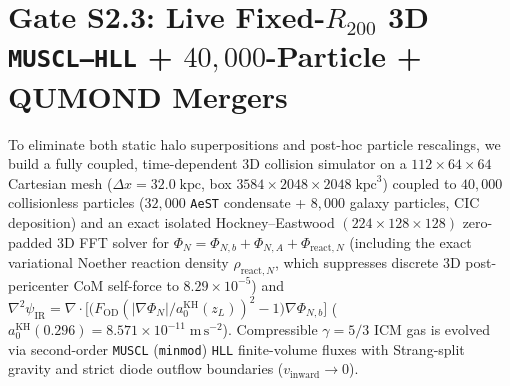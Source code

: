 \documentclass[11pt,a4paper]{article}
\begin{document}
\section{\texorpdfstring{Gate S2.3: Live Fixed-$R_{200}$ 3D \texttt{MUSCL--HLL} + $40{,}000$-Particle + QUMOND Mergers}{Gate S2.3: Live Fixed-R200 3D MUSCL-HLL + 40,000-Particle + QUMOND Mergers}}
\label{sec:step2-bullet}
To eliminate both static halo superpositions and post-hoc particle rescalings, we build a fully coupled, time-dependent 3D collision simulator on a $112\times 64\times 64$ Cartesian mesh ($\Delta x = 32.0\;\mathrm{kpc}$, box $3584\times 2048\times 2048\;\mathrm{kpc}^3$) coupled to $40{,}000$ collisionless particles ($32{,}000$ \texttt{AeST} condensate + $8{,}000$ galaxy particles, CIC deposition) and an exact isolated Hockney--Eastwood $(224\times 128\times 128)$ zero-padded 3D FFT solver for $\Phi_N = \Phi_{N,b} + \Phi_{N,A} + \Phi_{\mathrm{react},N}$ (including the exact variational Noether reaction density $\rho_{\mathrm{react},N}$, which suppresses discrete 3D post-pericenter CoM self-force to $8.29\times 10^{-5}$) and $\nabla^2\psi_{\mathrm{IR}} = \nabla\cdot\bigl[\bigl(F_{\mathrm{OD}}(|\nabla\Phi_N|/a_0^{\mathrm{KH}}(z_L))^2 - 1\bigr)\nabla\Phi_{N,b}\bigr]$ ($a_0^{\mathrm{KH}}(0.296) = 8.571\times 10^{-11}\;\mathrm{m\,s^{-2}}$). Compressible $\gamma = 5/3$ ICM gas is evolved via second-order \texttt{MUSCL} (\texttt{minmod}) \texttt{HLL} finite-volume fluxes with Strang-split gravity and strict diode outflow boundaries ($v_{\mathrm{inward}} \to 0$).
\end{document}
